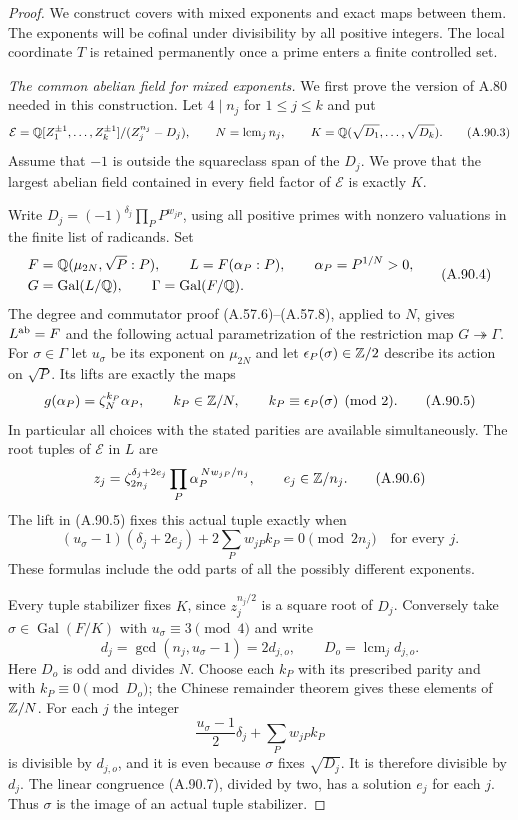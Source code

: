 \begin{proof}
We construct covers with mixed exponents and exact maps
between them.  The exponents will be cofinal under
divisibility by all positive integers.
The local coordinate $T$ is retained permanently once
a prime enters a finite controlled set.

\emph{The common abelian field for mixed exponents.}
We first prove the version of A.80 needed in this
construction.  Let $4\mid n_j$ for $1\le j\le k$ and put
\[
 \mathcal E=\mathbb Q[Z_1^{\pm1},\ldots,Z_k^{\pm1}]
                         /(Z_j^{n_j}-D_j),\qquad
 N=\operatorname{lcm}_j n_j,\qquad
 K=\mathbb Q(\sqrt{D_1},\ldots,\sqrt{D_k}).
 \tag{A.90.3}
\]
Assume that $-1$ is outside the squareclass span of
the $D_j$.  We prove that the largest abelian field
contained in every field factor of $\mathcal E$ is
exactly $K$.

Write $D_j=(-1)^{\delta_j}\prod_P P^{w_{jP}}$, using
all positive primes with nonzero valuations in the
finite list of radicands.  Set
\[
\begin{aligned}
 F&=\mathbb Q(\mu_{2N},\sqrt P:P),\qquad
 L=F(\alpha_P:P),\qquad \alpha_P=P^{1/N}>0,\\
 G&=\operatorname{Gal}(L/\mathbb Q),\qquad
 \Gamma=\operatorname{Gal}(F/\mathbb Q).
\end{aligned}
 \tag{A.90.4}
\]
The degree and commutator proof (A.57.6)--(A.57.8),
applied to $N$, gives $L^{\rm ab}=F$ and the following
actual parametrization of the restriction map
$G\twoheadrightarrow\Gamma$.
For $\sigma\in\Gamma$ let $u_\sigma$ be its exponent
on $\mu_{2N}$ and let
$\epsilon_P(\sigma)\in\mathbb Z/2$ describe its action on
$\sqrt P$.  Its lifts are exactly the maps
\[
 g(\alpha_P)=\zeta_N^{k_P}\alpha_P,\qquad
 k_P\in\mathbb Z/N,\qquad
 k_P\equiv\epsilon_P(\sigma)\pmod2 .
 \tag{A.90.5}
\]
In particular all choices with the stated parities
are available simultaneously.
The root tuples of $\mathcal E$ in $L$ are
\[
 z_j=\zeta_{2n_j}^{\delta_j+2e_j}
             \prod_P\alpha_P^{\,Nw_{jP}/n_j},
                       \qquad e_j\in\mathbb Z/n_j.
 \tag{A.90.6}
\]
The lift in (A.90.5) fixes this actual tuple exactly when
\[
 (u_\sigma-1)(\delta_j+2e_j)
                 +2\sum_Pw_{jP}k_P=0\pmod{2n_j}
                                  \quad\text{for every }j.
 \tag{A.90.7}
\]
These formulas include the odd parts of all the
possibly different exponents.

Every tuple stabilizer fixes $K$, since
$z_j^{n_j/2}$ is a square root of $D_j$.
Conversely take $\sigma\in\operatorname{Gal}(F/K)$
with $u_\sigma\equiv3\pmod4$ and write
\[
 d_j=\gcd(n_j,u_\sigma-1)=2d_{j,o},\qquad
 D_o=\operatorname{lcm}_j d_{j,o}.
 \tag{A.90.8}
\]
Here $D_o$ is odd and divides $N$.
Choose each $k_P$ with its prescribed parity and with
$k_P\equiv0\pmod{D_o}$; the Chinese remainder theorem
gives these elements of $\mathbb Z/N$.
For each $j$ the integer
\[
       \frac{u_\sigma-1}{2}\delta_j+\sum_Pw_{jP}k_P
 \tag{A.90.9}
\]
is divisible by $d_{j,o}$, and it is even because
$\sigma$ fixes $\sqrt{D_j}$.
It is therefore divisible by $d_j$.
The linear congruence (A.90.7), divided by two, has a
solution $e_j$ for each $j$.
Thus $\sigma$ is the image of an actual tuple stabilizer.


\end{proof}
